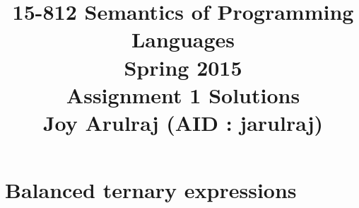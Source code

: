 \documentclass[a4paper,10pt]{article}
\begin{document}
\title{\textbf{15-812 Semantics of Programming Languages \\ Spring 2015 \\
{\large Assignment 1 Solutions}}\\\vspace{0.3in}
{\Large \bf Joy Arulraj (AID : jarulraj)}}

\date{}
\author{}

\maketitle


\section{Balanced ternary expressions}
\end{document}
